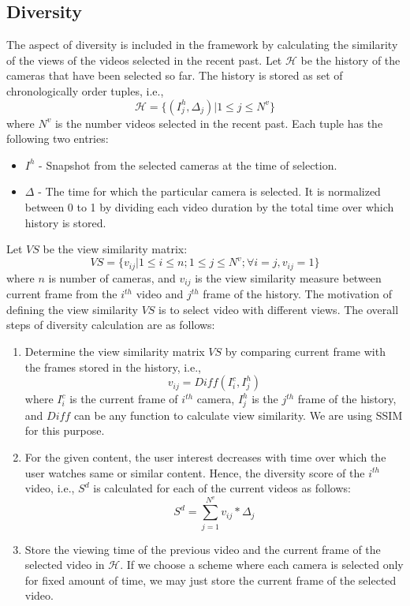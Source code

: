 \documentclass{sig-alternate}
\begin{document}
\subsection{Diversity}
The aspect of diversity is included in the framework by calculating
the similarity of the views of the videos selected in the recent
past. Let $\mathcal{H}$ be the history of the cameras that have been selected so far. The history is stored as set of chronologically order tuples, i.e.,
\begin{equation}
    \mathcal{H}=\{(I_j^h,\Delta_j)|1\leq j\leq N^v\}
\end{equation}
where $N^v$ is the number videos selected in the recent past. Each
tuple has the following two entries:
 \begin{itemize} 
    \item $I^h$ - Snapshot from the selected cameras at the time of selection.
    \item $\Delta$ - The time for which the particular camera is selected. It is normalized between 0 to 1 by dividing each video duration by the total time over which history is stored. 
 \end{itemize} 
Let $VS$ be the view similarity matrix:
\begin{equation}
    VS=\{v_{ij}|1\leq i\leq n;1\leq j\leq N^v;\forall i=j,v_{ij}=1\}
\end{equation}
where $n$ is number of cameras, and $v_{ij}$ is the view similarity
measure between current frame from the $i^{th}$ video and $j^{th}$ frame of the history. The motivation of defining the view similarity $VS$ is to select video with different views. The overall steps of diversity calculation are as follows:
 \begin{enumerate} 
    \item Determine the view similarity matrix $VS$ by comparing current frame with the frames stored in the history, i.e.,
    \begin{equation}\label{eq:15}
        v_{ij}=Diff(I_i^c,I_j^h)
    \end{equation}
    where $I_i^c$ is the current frame of $i^{th}$ camera, $I_j^h$ is the $j^{th}$ frame of the history, and $Diff$ can be any function to calculate view similarity. We are using SSIM \cite{17} for this purpose.
    \item For the given content, the user interest decreases with time over which the user watches same or similar content. Hence, the diversity score of the $i^{th}$ video, i.e., $S^d$ is calculated for each of the current videos as follows:
    \begin{equation}
        S^d=\sum_{j=1}^{N^v}v_{ij}*\Delta_j
    \end{equation}
    \item Store the viewing time of the previous video and the current frame of the selected video in $\mathcal{H}$. If we choose a scheme where each camera is selected only for fixed amount of time, we may just store the current frame of the selected video.
 \end{enumerate} 
\end{document}
